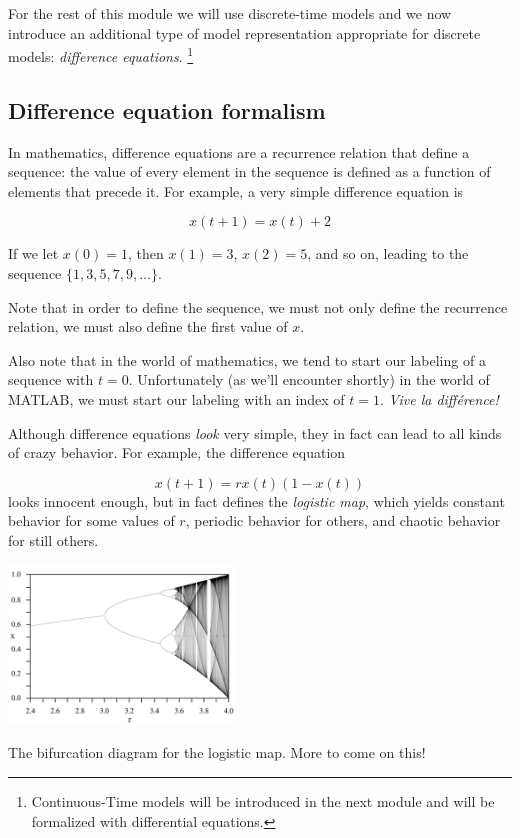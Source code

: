 For the rest of this module we will use discrete-time models and we now introduce an additional type of model representation appropriate for discrete models: {\it difference equations}. \footnote{Continuous-Time models will be introduced in the next module and will be formalized with differential equations.}

\subsection{Difference equation formalism}

In mathematics, difference equations are a recurrence relation that define a sequence:  the value of every element in the sequence is defined as a function of elements that precede it.  For example, a very simple difference equation is

$$x(t+1) = x(t) + 2$$

If we let $x(0) = 1$, then $x(1) = 3$, $x(2) = 5$, and so on, leading to the sequence $\{ 1, 3, 5, 7, 9, ... \} $.

Note that in order to define the sequence, we must not only define the recurrence relation, we must also define the first value of $x$.

Also note that in the world of mathematics, we tend to start our labeling of a sequence with $t=0$.  Unfortunately (as we'll encounter shortly) in the world of MATLAB, we must start our labeling with an index of $t=1$.   {\it Vive la diff{\' e}rence!} 

Although difference equations {\it look} very simple, they in fact can lead to all kinds of crazy behavior.  For example, the difference equation

$$x(t+1) =r x(t)(1-x(t))$$
looks innocent enough, but in fact defines the {\it logistic map}, which yields constant behavior for some values of $r$, periodic behavior for others, and chaotic behavior for still others.
\begin{marginfigure}
\includegraphics[width=6cm]{figs/bifurcation}
\caption{The bifurcation diagram for the logistic map.  More to come on this!}
\end{marginfigure}


